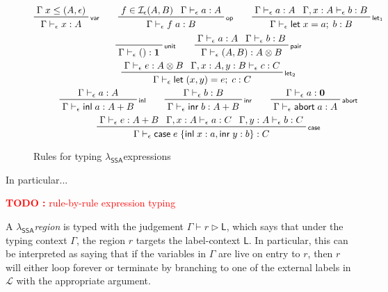 \documentclass[acmsmall,screen,review]{acmart}
\newcounter{todos}
\newcommand{\TODO}[1]{{
  \stepcounter{todos}
  \begin{center}\large{\textcolor{red}{\textbf{TODO \arabic{todos}:} #1}}\end{center}
}}
\newcommand{\mc}[1]{\ensuremath{\mathcal{#1}}}
\newcommand{\mb}[1]{\ensuremath{\mathbf{#1}}}
\newcommand{\ms}[1]{\ensuremath{\mathsf{#1}}}
\newcommand{\lto}{:}
\newcommand{\linl}[1]{\ms{inl}\;{#1}}
\newcommand{\linr}[1]{\ms{inr}\;{#1}}
\newcommand{\labort}[1]{\ms{abort}\;{#1}}
\newcommand{\letexpr}[3]{\ensuremath{\ms{let}\;#1 = #2;\;#3}}
\newcommand{\caseexpr}[5]{\ms{case}\;#1\;\{\linl{#2} \lto #3, \linr{#4} \lto #5\}}
\newcommand{\bhyp}[2]{#1 : #2}
\newcommand{\rle}[1]{{\scriptsize\textsf{#1}}}
\newcommand{\hasty}[4]{#1 \vdash_{#2} #3: {#4}}
\newcommand{\haslb}[3]{#1 \vdash #2 \rhd #3}
\newcommand{\isop}[4]{#1 \in \mc{I}_{#4}(#2, #3)}
\newcommand{\isotopessa}{\(\lambda_{\ms{SSA}}\)}
\begin{document}
\begin{figure}[H]
  \begin{gather*}
    \prftree[r]{\rle{var}}{\Gamma\;x \leq (A, \epsilon)}{\hasty{\Gamma}{\epsilon}{x}{A}} \qquad
    \prftree[r]{\rle{op}}{\isop{f}{A}{B}{\epsilon}}{\hasty{\Gamma}{\epsilon}{a}{A}}
      {\hasty{\Gamma}{\epsilon}{f\;a}{B}} \qquad
    \prftree[r]{\rle{let$_1$}}
      {\hasty{\Gamma}{\epsilon}{a}{A}}
      {\hasty{\Gamma, \bhyp{x}{A}}{\epsilon}{b}{B}}
      {\hasty{\Gamma}{\epsilon}{\letexpr{x}{a}{b}}{B}} \\
    \prftree[r]{\rle{unit}}{\hasty{\Gamma}{\epsilon}{()}{\mb{1}}} \qquad
    \prftree[r]{\rle{pair}}{\hasty{\Gamma}{\epsilon}{a}{A}}{\hasty{\Gamma}{\epsilon}{b}{B}}
      {\hasty{\Gamma}{\epsilon}{(A, B)}{A \otimes B}} \\
    \prftree[r]{\rle{let$_2$}}
      {\hasty{\Gamma}{\epsilon}{e}{A \otimes B}}
      {\hasty{\Gamma, \bhyp{x}{A}, \bhyp{y}{B}}{\epsilon}{c}{C}}
      {\hasty{\Gamma}{\epsilon}{\letexpr{(x, y)}{e}{c}}{C}} \\
    \prftree[r]{\rle{inl}}{\hasty{\Gamma}{\epsilon}{a}{A}}
      {\hasty{\Gamma}{\epsilon}{\linl{a}}{A + B}} \qquad
    \prftree[r]{\rle{inr}}{\hasty{\Gamma}{\epsilon}{b}{B}}
      {\hasty{\Gamma}{\epsilon}{\linr{b}}{A + B}} \qquad
    \prftree[r]{\rle{abort}}{\hasty{\Gamma}{\epsilon}{a}{\mb{0}}}
      {\hasty{\Gamma}{\epsilon}{\labort{a}}{A}} \\
    \prftree[r]{\rle{case}}
      {\hasty{\Gamma}{\epsilon}{e}{A + B}}
      {\hasty{\Gamma, \bhyp{x}{A}}{\epsilon}{a}{C}}
      {\hasty{\Gamma, \bhyp{y}{A}}{\epsilon}{b}{C}}
      {\hasty{\Gamma}{\epsilon}{\caseexpr{e}{x}{a}{y}{b}}{C}}
  \end{gather*}
  \caption{Rules for typing \isotopessa expressions}
  \label{fig:ssa-expr-rules}
\end{figure}

In particular...

\TODO{rule-by-rule expression typing}

A \isotopessa \textit{region} is typed with the judgement $\haslb{\Gamma}{r}{\ms{L}}$, which says
that under the typing context $\Gamma$, the region $r$ targets the label-context $\ms{L}$. In
particular, this can be interpreted as saying that if the variables in $\Gamma$ are live on entry to
$r$, then $r$ will either loop forever or terminate by branching to one of the external labels in
$\mc{L}$ with the appropriate argument.
\end{document}
